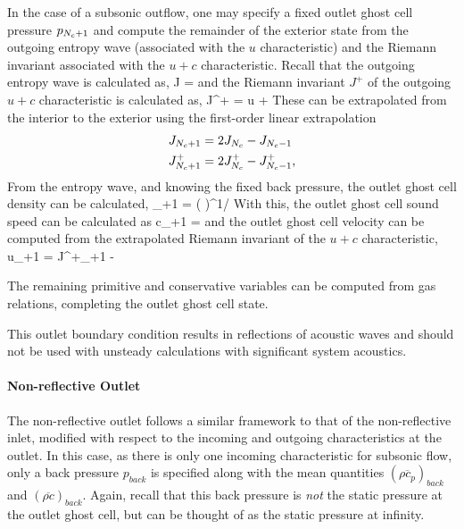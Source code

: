 In the case of a subsonic outflow, one may specify a fixed outlet ghost cell pressure $p_{N_c+1}$ and compute the remainder of the exterior state from the outgoing entropy wave (associated with the $u$ characteristic) and the Riemann invariant associated with the $u+c$ characteristic. Recall that the outgoing entropy wave is calculated as,
\be
	J = 
\ee
and the Riemann invariant $J^+$ of the outgoing $u+c$ characteristic is calculated as,
\be
	J^+ = u + 
\ee
These can be extrapolated from the interior to the exterior using the first-order linear extrapolation
\begin{align}
    J_{N_c+1} &= 2 J_{N_c} - J_{N_c-1} \\
    J^+_{N_c+1} &= 2 J^+_{N_c} - J^+_{N_c-1}, 
\end{align}
From the entropy wave, and knowing the fixed back pressure, the outlet ghost cell density can be calculated,
\be
	\rho_{\numCells+1} = \left(  \right)^{1/\gamma}
\ee
With this, the outlet ghost cell sound speed can be calculated as 
\be
c_{\numCells+1} = 
\ee
and the outlet ghost cell velocity can be computed from the extrapolated Riemann invariant of the $u+c$ characteristic,
\be
	u_{\numCells+1} = J^+_{\numCells+1} - 
\ee

The remaining primitive and conservative variables can be computed from gas relations, completing the outlet ghost cell state. 

This outlet boundary condition results in reflections of acoustic waves and should not be used with unsteady calculations with significant system acoustics.

\paragraph{Non-reflective Outlet}

The non-reflective outlet follows a similar framework to that of the non-reflective inlet, modified with respect to the incoming and outgoing characteristics at the outlet. In this case, as there is only one incoming characteristic for subsonic flow, only a back pressure $p_{back}$ is specified along with the mean quantities $(\overline{\rho c_p})_{back}$ and $(\overline{\rho c})_{back}$. Again, recall that this back pressure is \textit{not} the static pressure at the outlet ghost cell, but can be thought of as the static pressure at infinity.


